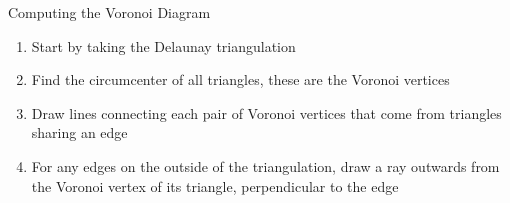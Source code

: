 \begin{frame}{Computing the Voronoi Diagram}
	\begin{enumerate}
		\item Start by taking the Delaunay triangulation
		\item Find the circumcenter of all triangles, these are the Voronoi vertices
		\item Draw lines connecting each pair of Voronoi vertices that come from triangles sharing an edge
		\item For any edges on the outside of the triangulation, draw a ray outwards from the Voronoi vertex of its triangle, perpendicular to the edge
	\end{enumerate}
\end{frame}
